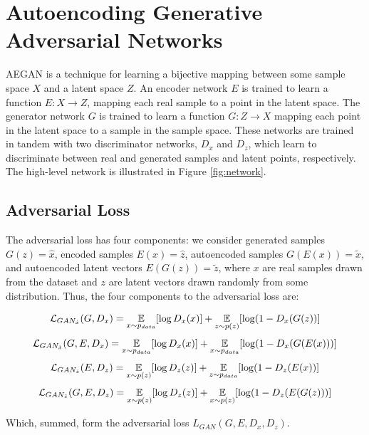 \documentclass{article}
\begin{document}
\section{Autoencoding Generative Adversarial Networks}
AEGAN is a technique for learning a bijective mapping between some sample space $X$ and a latent space $Z$. An encoder network $E$ is trained to learn a function $E : X \rightarrow Z$, mapping each real sample to a point in the latent space. The generator network $G$ is trained to learn a function $G : Z \rightarrow X$ mapping each point in the latent space to a sample in the sample space. These networks are trained in tandem with two discriminator networks, $D_x$ and $D_z$, which learn to discriminate between real and generated samples and latent points, respectively. The high-level network is illustrated in Figure \ref{fig:network}.

\subsection{Adversarial Loss}
The adversarial loss has four components: we consider generated samples $G(z) = \hat{x}$, encoded samples $E(x) = \hat{z}$, autoencoded samples $G(E(x)) = \widetilde{x}$, and autoencoded latent vectors $E(G(z)) = \widetilde{z}$, where $x$ are real samples drawn from the dataset and $z$ are latent vectors drawn randomly from some distribution. Thus, the four components to the adversarial loss are:

\begin{equation}
\mathcal{L}_{GAN_{\hat{x}}}(G, D_x) = \operatorname*{\mathbb{E}}_{x \sim p_{data}}[\log D_{x}(x)] + \operatorname*{\mathbb{E}}_{z \sim p(z)}[\log (1 - D_{x}(G(z))]
\end{equation}
\begin{equation}
\mathcal{L}_{GAN_{\tilde{x}}}(G, E, D_x) = \operatorname*{\mathbb{E}}_{x \sim p_{data}}[\log D_{x}(x)] + \operatorname*{\mathbb{E}}_{x \sim p_{data}}[\log (1 - D_{x}(G(E(x)))]
\end{equation}
\begin{equation}
\mathcal{L}_{GAN_{\hat{z}}}(E, D_z) = \operatorname*{\mathbb{E}}_{x \sim p(z)}[\log D_{z}(z)] + \operatorname*{\mathbb{E}}_{z \sim p_{data}}[\log (1 - D_{z}(E(x))]
\end{equation}
\begin{equation}
\mathcal{L}_{GAN_{\tilde{z}}}(G, E, D_z) = \operatorname*{\mathbb{E}}_{x \sim p(z)}[\log D_{z}(z)] + \operatorname*{\mathbb{E}}_{x \sim p(z)}[\log (1 - D_{z}(E(G(z)))]
\end{equation}

Which, summed, form the adversarial loss ${L}_{GAN}(G, E, D_x, D_z)$.
\end{document}
